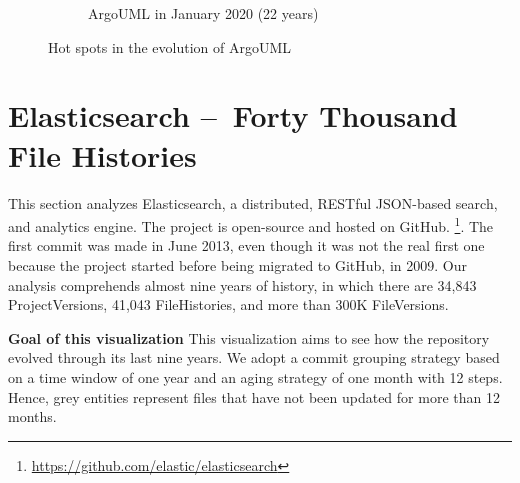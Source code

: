 \begin{figure}[ht]
\begin{subfigure}{0.48\textwidth}
        \caption{ArgoUML in January 2020 (22 years)} 
        \label{fig:ArgoUML_V3_S6}
    \end{subfigure}
    
    \caption{Hot spots in the evolution of ArgoUML} 
    \label{fig:ArgoUML_V3}
\end{figure}
\clearpage

\section{Elasticsearch – Forty Thousand File Histories}
This section analyzes Elasticsearch, a distributed, RESTful JSON-based search, and analytics engine. 
The project is open-source and hosted on GitHub. \footnote{\url{https://github.com/elastic/elasticsearch}}. 
The first commit was made in June 2013, even though it was not the real first one because the project started before being migrated to GitHub, in 2009.
Our analysis comprehends almost nine years of history, in which there are 34,843 ProjectVersions, 41,043 FileHistories, and more than 300K FileVersions. 

\bigbreak
\textbf{Goal of this visualization}
This visualization aims to see how the repository evolved through its last nine years. We adopt a commit grouping strategy based on a time window of one year and an aging strategy of one month with 12 steps. Hence, grey entities represent files that have not been updated for more than 12 months. 


